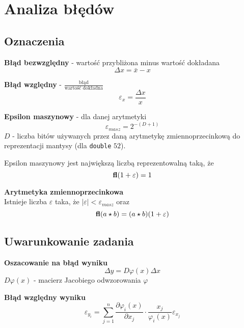 \documentclass[../mn-notatki.tex]{subfiles}
\begin{document}
\section{Analiza błędów}

\subsection{Oznaczenia}

\begin{tcolorbox}
\textbf{Błąd bezwzględny} - wartość przybliżona minus wartość dokładana
\[
\Delta x = \bar{x} - x
\]
\end{tcolorbox}

\begin{tcolorbox}
\textbf{Błąd względny} - $\frac{\text{błąd}}{\text{wartość dokładna}}$
\[
\varepsilon_x = \frac{\Delta x}{x}
\]
\end{tcolorbox}

\begin{tcolorbox}
\textbf{Epsilon maszynowy} - dla danej arytmetyki
\[
\varepsilon_{masz} = 2^{-(D+1)}
\]
$D$ - liczba bitów używanych przez daną arytmetykę zmiennoprzecinkową do
reprezentacji mantysy (dla \texttt{double} $52$).

Epsilon maszynowy jest największą liczbą reprezentowalną taką, że
\[
\textbf{fl}(1 + \varepsilon) = 1
\]
\end{tcolorbox}

\begin{tcolorbox}
\textbf{Arytmetyka zmiennoprzecinkowa}\\
Istnieje liczba $\varepsilon$ taka, że $|\varepsilon| < \varepsilon_{masz}$ oraz
\[
\textbf{fl}(a \star b) = (a \star b)(1 + \varepsilon)
\]
\end{tcolorbox}


\subsection{Uwarunkowanie zadania}

\begin{tcolorbox}
\textbf{Oszacowanie na błąd wyniku}\\
\[
\Delta y = D \varphi(x) \Delta x
\]
$D \varphi(x)$ - macierz Jacobiego odwzorowania $\varphi$
\end{tcolorbox}

\begin{tcolorbox}
\textbf{Błąd względny wyniku}\\
\[
\varepsilon_{y_i} = \sum_{j=1}^{n} \frac{\partial \varphi_i(x)}{\partial x_j}
\cdot \frac{x_j}{\varphi_i(x)} \varepsilon_{x_j}
\]
\end{tcolorbox}
\end{document}
